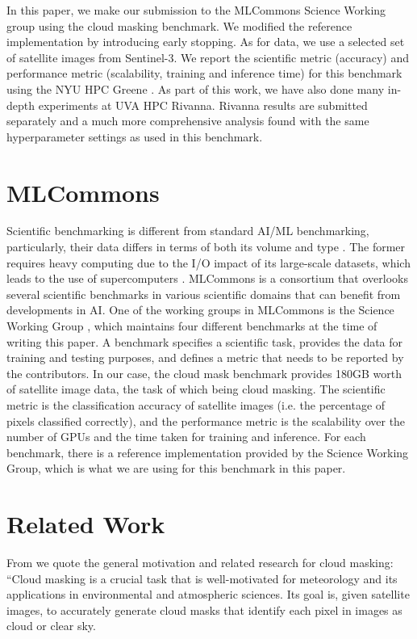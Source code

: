 \documentclass[sigplan,screen]{acmart}
\begin{document}
In this paper, we make our submission to the MLCommons Science Working group using the cloud masking benchmark. We modified the reference implementation by introducing early stopping. As for data, we use a selected set of satellite images from Sentinel-3. We report the scientific metric (accuracy) and performance metric 
(scalability, training and inference time)
for this benchmark using the NYU HPC Greene \cite{www-greene}. As part of this work, we have also done many in-depth experiments at UVA HPC Rivanna. Rivanna results are submitted separately and a much more  comprehensive analysis found with the same hyperparameter settings as used in this benchmark.

\section{MLCommons}

Scientific benchmarking is different from standard AI/ML benchmarking, particularly, their data differs in terms of both its volume and type \cite{las-2023-mlcommons-edu-eq}. The former requires heavy computing due to the I/O impact of its large-scale datasets, which leads to the use of supercomputers \cite{Farrell2021MLPerfHA}. MLCommons is a consortium that overlooks several scientific benchmarks in various scientific domains that can benefit from developments in AI. One of the working groups in MLCommons is the Science Working Group \cite{Thiyagalingam2022AIBF}, which maintains four different benchmarks at the time of writing this paper. A benchmark specifies a scientific task, provides the data for training and testing purposes, and defines a metric that needs to be reported by the contributors. In our case, the cloud mask benchmark provides 180GB worth of satellite image data, the task of which being cloud masking. The scientific metric is the classification accuracy of satellite images (i.e. the percentage of pixels classified correctly), and the performance metric is the scalability over the number of GPUs and the time taken for training and inference. 
For each benchmark, there is a reference implementation provided by the Science Working Group, which is what we are using for this benchmark in this paper.

\section{Related Work}

From \cite{las-2023-cloudmask-related} we quote the general motivation and related research for cloud masking: ``Cloud masking is a crucial task that is well-motivated for meteorology and its applications in environmental and atmospheric sciences. Its goal is, given satellite images, to accurately generate cloud masks that identify each pixel in images as cloud or clear sky.
\end{document}
